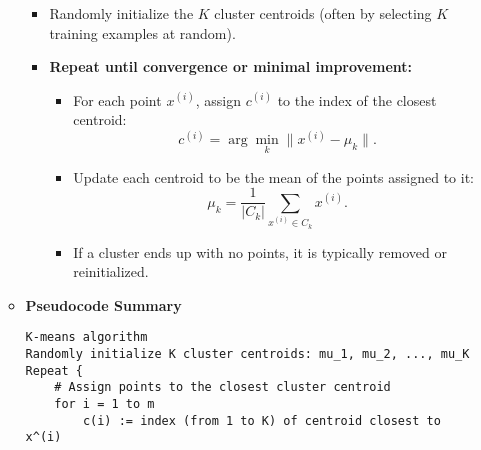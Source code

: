 \documentclass[10pt]{article}
\begin{document}
\begin{itemize}
\begin{itemize}
\begin{itemize}
            \item Randomly initialize the $K$ cluster centroids (often by selecting $K$ training examples at random).
            \item \textbf{Repeat until convergence or minimal improvement:}
            \begin{itemize}
                \item For each point $x^{(i)}$, assign $c^{(i)}$ to the index of the closest centroid:
                \[
                c^{(i)} = \arg \min_{k} \| x^{(i)} - \mu_k\|.
                \]
                \item Update each centroid to be the mean of the points assigned to it:
                \[
                \mu_k = \frac{1}{|C_k|} \sum_{x^{(i)} \in C_k} x^{(i)}.
                \]
                \item If a cluster ends up with no points, it is typically removed or reinitialized.
            \end{itemize}
        \end{itemize}
        \item \textbf{Pseudocode Summary}
        \begin{verbatim}
K-means algorithm
Randomly initialize K cluster centroids: mu_1, mu_2, ..., mu_K
Repeat {
    # Assign points to the closest cluster centroid
    for i = 1 to m
        c(i) := index (from 1 to K) of centroid closest to x^(i)


\end{verbatim}
\end{itemize}
\end{itemize}
\end{document}
